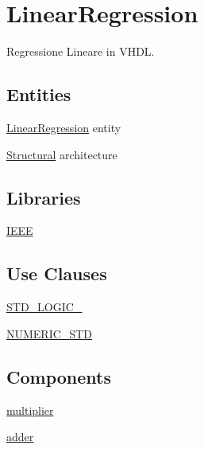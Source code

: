 \hypertarget{group___linear_regression}{}\section{Linear\+Regression}
\label{group___linear_regression}


Regressione Lineare in V\+H\+DL.  


\subsection*{Entities}
\begin{DoxyCompactItemize}
\item 
\hyperlink{class_linear_regression}{Linear\+Regression} entity
\item 
\hyperlink{class_linear_regression_1_1_structural}{Structural} architecture
\end{DoxyCompactItemize}
\subsection*{Libraries}
 \begin{DoxyCompactItemize}
\item 
\hyperlink{group___linear_regression_gae4f03c286607f3181e16b9aa12d0c6d4}{I\+E\+EE} 
\end{DoxyCompactItemize}
\subsection*{Use Clauses}
 \begin{DoxyCompactItemize}
\item 
\hyperlink{group___linear_regression_gaa4b2b25246a821511120e3149b003563}{S\+T\+D\+\_\+\+L\+O\+G\+I\+C\+\_}   
\item 
\hyperlink{group___linear_regression_gae00f3f04545af57582ff10609eee23e2}{N\+U\+M\+E\+R\+I\+C\+\_\+\+S\+TD}   
\end{DoxyCompactItemize}
\subsection*{Components}
 \begin{DoxyCompactItemize}
\item 
\hyperlink{group___linear_regression_ga3cf9cbfc3e637ae0660c32ceef50386f}{multiplier}  {\bfseries }  
\item 
\hyperlink{group___linear_regression_ga9d7a8a381439c61aea549e7a47ec7a6f}{adder}  {\bfseries }  
\end{DoxyCompactItemize}

